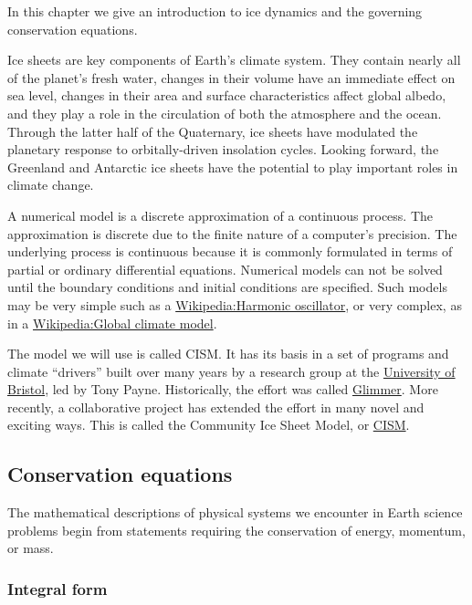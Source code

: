 
In this chapter we give an introduction to ice dynamics and the governing conservation equations.

Ice sheets are key components of Earth's climate system. They contain
nearly all of the planet's fresh water, changes in their volume have an
immediate effect on sea level, changes in their area and surface
characteristics affect global albedo, and they play a role in the
circulation of both the atmosphere and the ocean. Through the latter
half of the Quaternary, ice sheets have modulated the planetary response
to orbitally-driven insolation cycles. Looking forward, the Greenland
and Antarctic ice sheets have the potential to play important roles in
climate change.

A numerical model is a discrete approximation of a continuous process.
The approximation is discrete due to the finite nature of a computer's
precision. The underlying process is continuous because it is commonly
formulated in terms of partial or ordinary differential equations.
Numerical models can not be solved until the boundary conditions and
initial conditions are specified. Such models may be very simple such as
a \href{Wikipedia:Harmonic oscillator}{Wikipedia:Harmonic oscillator},
or very complex, as in a
\href{Wikipedia:Global climate model}{Wikipedia:Global climate model}.

The model we will use is called CISM. It has its basis in a set of
programs and climate ``drivers'' built over many years by a research
group at the \href{http://www.bris.ac.uk/}{University of Bristol}, led
by Tony Payne. Historically, the effort was called
\href{http://forge.nesc.ac.uk/projects/glimmer/}{Glimmer}. More
recently, a collaborative project has extended the effort in many novel
and exciting ways. This is called the Community Ice Sheet Model, or
\href{http://websrv.cs.umt.edu/isis/}{CISM}.



\subsection{Conservation equations}

The mathematical descriptions of physical systems we encounter in Earth
science problems begin from statements requiring the conservation of
energy, momentum, or mass.

\subsubsection{Integral form}

